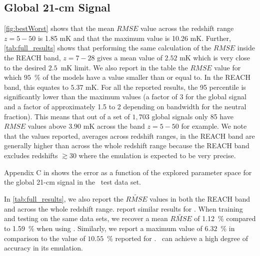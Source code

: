 \subsection{Global 21-cm Signal}

\cref{fig:bestWorst} shows that the mean $RMSE$ value across the redshift range $z=5 - 50$ is 1.85 mK and that the maximum value is 10.26 mK. Further, \cref{tab:full_results} shows that performing the same calculation of the $RMSE$ inside the REACH band, $z=7-28$ gives a mean value of $2.52$ mK which is very close to the desired $2.5$~mK limit. We also report in the table the $RMSE$ value for which $95$~\% of the models have a value smaller than or equal to. In the REACH band, this equates to $5.37$ mK. For all the reported results, the 95 percentile is significantly lower than the maximum values (a factor of 3 for the global signal and a factor of approximately 1.5 to 2 depending on bandwidth for the neutral fraction). This means that out of a set of $1,703$ global signals only 85 have $RMSE$ values above $3.90$ mK across the band $z = 5-50$ for example. We note that the values reported, averages across redshift ranges, in the REACH band are generally higher than across the whole redshift range because the REACH band excludes redshifts $\gtrsim 30$ where the emulation is expected to be very precise.

Appendix C in \cite{Bevins_globalemu_2021} shows the error as a function of the explored parameter space for the global 21-cm signal in the \cmGEM~test data set.

In \cref{tab:full_results}, we also report the $\widetilde{RMSE}$ values in both the REACH band and across the whole redshift range. \cite{Cohen2020} report similar results for \cmGEM. When training and testing on the same data sets, we recover a mean $\widetilde{RMSE}$ of 1.12~\% compared to 1.59~\% when using \cmGEM. Similarly, we report a maximum value of $6.32$~\% in comparison to the value of $10.55$~\% reported for \cmGEM. \name~can achieve a high degree of accuracy in its emulation.

